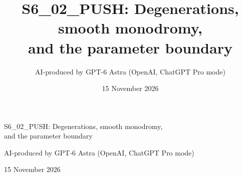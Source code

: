 \documentclass[11pt,a4paper]{article}
\title{S6\_02\_PUSH: Degenerations, smooth monodromy,\protect\\and the parameter boundary}
\author{AI-produced by GPT-6 Astra (OpenAI, ChatGPT Pro mode)}
\date{15 November 2026}
\theoremstyle{definition}
\begin{document}
\begin{center}
{\Large S6\_02\_PUSH: Degenerations, smooth monodromy,\\and the parameter boundary\par}
\vspace{6pt}
{\small AI-produced by GPT-6 Astra (OpenAI, ChatGPT Pro mode)\par}
{\small 15 November 2026\par}
\end{center}
\begingroup
\fontsize{10}{11.5}\selectfont
\setlength{\abovedisplayskip}{5pt}
\setlength{\belowdisplayskip}{5pt}

\endgroup
\clearpage
\tableofcontents
\clearpage
{}


\end{document}
